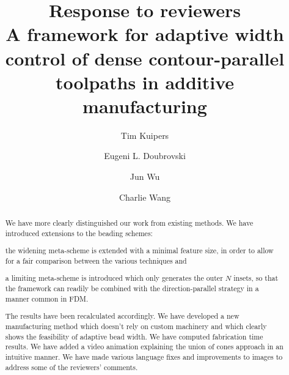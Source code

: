 \documentclass[5p,twocolumn,10pt,times]{elsarticle}
\theoremstyle{definition}
\numberwithin{question}{section}
\begin{document}
\baselineskip11pt 

\begin{frontmatter} 

\title{
Response to reviewers
\\
\large{A framework for adaptive width control of dense contour-parallel toolpaths in additive manufacturing}
}



\author[um,tud]{Tim Kuipers}
\author[tud]{Eugeni L. Doubrovski}
\author[tud]{Jun Wu}
\author[cuhk]{Charlie Wang}
\address[um]{Ultimaker, Utrecht, The Netherlands}
\address[tud]{Department of Design Engineering, Delft University of Technology, The Netherlands}
\address[cuhk]{Department of Mechanical and Automation Engineering, The Chinese University of Hong Kong, Hong Kong SAR, China}

\begin{abstract}
We have more clearly distinguished our work from existing methods.
We have introduced extensions to the beading schemes:
\begin{enumerate*}
\item the widening meta-scheme is extended with a minimal feature size, in order to allow for a fair comparison between the various techniques 
and
\item a limiting meta-scheme is introduced which only generates the outer $N$ insets, so that the framework can readily be combined with the direction-parallel strategy in a manner common in FDM.
\end{enumerate*}
The results have been recalculated accordingly.
We have developed a new manufacturing method which doesn't rely on custom machinery and which clearly shows the feasibility of adaptive bead width.
We have computed fabrication time results.
We have added a video animation explaining the union of cones approach in an intuitive manner.
We have made various language fixes and improvements to images to address some of the reviewers' comments.
\end{abstract}

%
%


\end{frontmatter}
\end{document}

